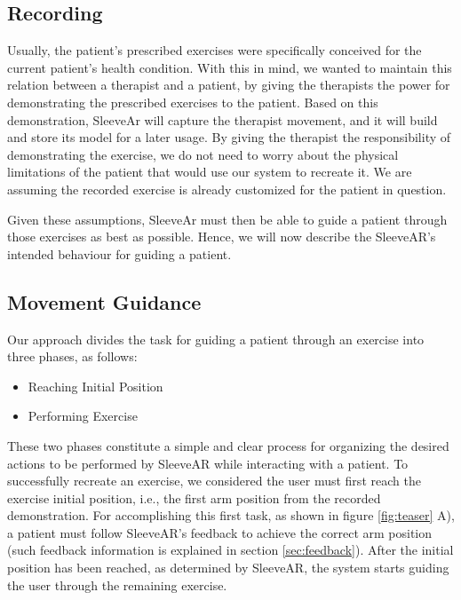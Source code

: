 \subsection{Recording}

Usually, the patient's prescribed exercises were specifically conceived for the current patient's health condition. 
With this in mind, we wanted to maintain this relation between a therapist and a patient, by giving the therapists the power for demonstrating the prescribed exercises to the patient. 
Based on this demonstration, SleeveAr will capture the therapist movement, and it will build and store its model for a later usage.
By giving the therapist the responsibility of demonstrating the exercise, we do not need to worry about the physical limitations of the patient that would use our system to recreate it. 
We are assuming the recorded exercise is already customized for the patient in question.

Given these assumptions, SleeveAr must then be able to guide a patient through those exercises as best as possible. Hence, we will now describe the SleeveAR's intended behaviour for guiding a patient.


\subsection{Movement Guidance}

Our approach divides the task for guiding a patient through an exercise into three phases, as follows:

\begin{itemize}
\item Reaching Initial Position
\item Performing Exercise
\end{itemize}

These two phases constitute a simple and clear process for organizing the desired actions to be performed by SleeveAR while interacting with a patient.
To successfully recreate an exercise, we considered the user must first reach the exercise initial position, i.e., the first arm position from the recorded demonstration.
For accomplishing this first task, as shown in figure \ref{fig:teaser} A), a patient must follow SleeveAR's feedback to achieve the correct arm position (such feedback information is explained in section \ref{sec:feedback}).
After the initial position has been reached, as determined by SleeveAR, the system starts guiding the user through the remaining exercise.

